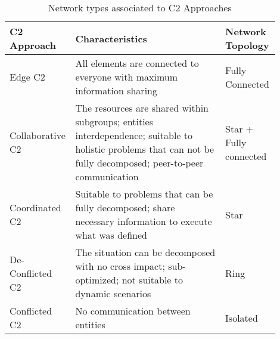 \begin{table}[ht]
	\small
	\fontsize{6}{6}\selectfont
	\centering
	\caption{Network types associated to C2 Approaches}
	\label{table:nec}
	
	\begin{tabular}{p{0.15\linewidth}p{0.55\linewidth}p{0.2\linewidth}}
	\hline
		\textbf{C2 Approach}
		& \textbf{Characteristics}
		& \textbf{Network Topology} \\ [1ex]
	\hline	
	Edge C2 & All elements are connected to everyone with maximum information sharing & Fully Connected \\[5ex]
	Collaborative C2 & The resources are shared within subgroups; entities interdependence; suitable to holistic problems that can not be fully decomposed; peer-to-peer communication & Star + Fully connected \\[5ex]
	Coordinated C2 & Suitable to problems that can be fully decomposed; share necessary information to execute what was defined & Star \\[5ex]
	De-Conflicted C2 & The situation can be decomposed with no cross impact; sub-optimized; not suitable to dynamic scenarios & Ring \\[5ex]
	Conflicted C2 & No communication between entities & Isolated \\[1ex]
	\hline
	\end{tabular}
\end{table} 

